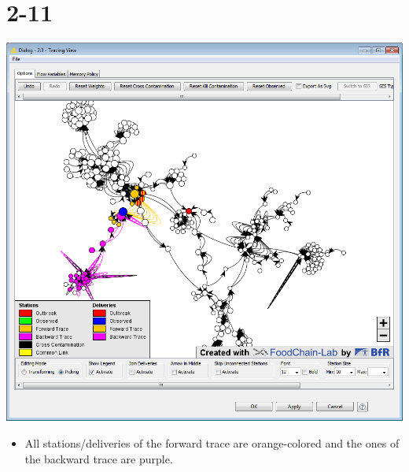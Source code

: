 \documentclass{beamer}
\begin{document}
\section{2-11}
\begin{frame}
	\begin{center}
  		\includegraphics[height=0.6\textheight]{2-11.png}
	\end{center}
	\begin{itemize}
		\item All stations/deliveries of the forward trace are orange-colored and the ones of the backward trace are purple.
	\end{itemize}
\end{frame}
\end{document}
